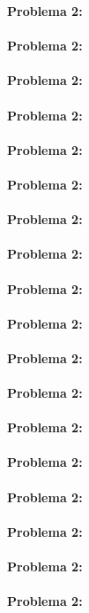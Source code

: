 \documentclass[10pt]{article}
\begin{document}
\textbf{Problema 2:} \\ \\
\textbf{Problema 2:} \\ \\
\textbf{Problema 2:} \\ \\
\textbf{Problema 2:} \\ \\
\textbf{Problema 2:} \\ \\
\textbf{Problema 2:} \\ \\
\textbf{Problema 2:} \\ \\
\textbf{Problema 2:} \\ \\
\textbf{Problema 2:} \\ \\


\textbf{Problema 2:} \\ \\
\textbf{Problema 2:} \\ \\
\textbf{Problema 2:} \\ \\
\textbf{Problema 2:} \\ \\
\textbf{Problema 2:} \\ \\
\textbf{Problema 2:} \\ \\
\textbf{Problema 2:} \\ \\
\textbf{Problema 2:} \\ \\
\textbf{Problema 2:} \\ \\
\end{document}
